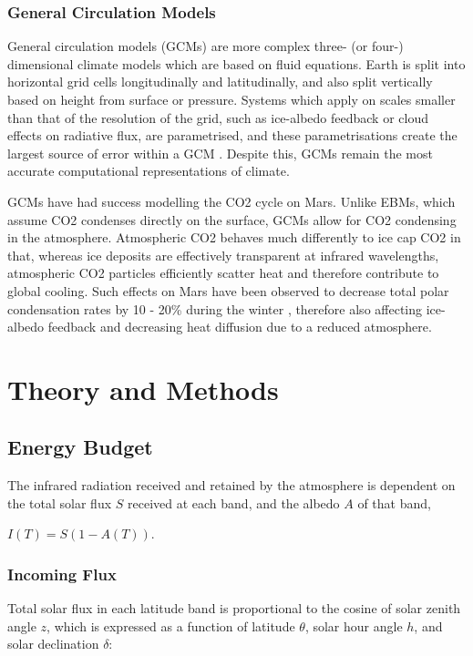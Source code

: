 \documentclass[12pt,onecolumn]{revtex4-2}    %
\begin{document}
\subsubsection{General Circulation Models}

General circulation models (GCMs) are more complex three- (or four-) dimensional climate models which are based on fluid equations. Earth is split into horizontal grid cells longitudinally and latitudinally, and also split vertically based on height from surface or pressure. Systems which apply on scales smaller than that of the resolution of the grid, such as ice-albedo feedback or cloud effects on radiative flux, are parametrised, and these parametrisations create the largest source of error within a GCM \cite{CBZH}. Despite this, GCMs remain the most accurate computational representations of climate.
\

GCMs have had success modelling the CO2 cycle on Mars. Unlike EBMs, which assume CO2 condenses directly on the surface, GCMs allow for CO2 condensing in the atmosphere. Atmospheric CO2 behaves much differently to ice cap CO2 in that, whereas ice deposits are effectively transparent at infrared wavelengths, atmospheric CO2 particles efficiently scatter heat and therefore contribute to global cooling. Such effects on Mars have been observed to decrease total polar condensation rates by 10 - 20\% during the winter \cite{FP96}, therefore also affecting ice-albedo feedback and decreasing heat diffusion due to a reduced atmosphere. 
 
\section{Theory and Methods} 
\subsection{Energy Budget}

The infrared radiation received and retained by the atmosphere is dependent on the total solar flux $S$ received at each band, and the albedo $A$ of that band,
\begin{center}
$I(T) = S(1-A(T))$.
\end{center}
\subsubsection{Incoming Flux}

Total solar flux in each latitude band is proportional to the cosine of solar zenith angle $z$, which is expressed  as a function of latitude $\theta$, solar hour angle $h$, and solar declination $\delta$:
\end{document}
